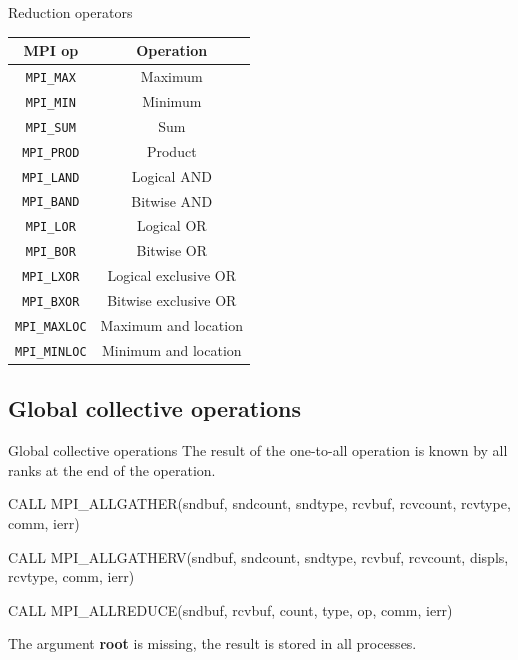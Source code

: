 \documentclass[aspectratio=43]{beamer}
\begin{document}
\begin{frame}[fragile]{Reduction operators}
\begin{center}
\begin{tabular}{|c||c|}
    \hline
    \color{cscsblue}\textbf{MPI op} & \color{cscsbrown}\textbf{Operation} \\\hline\hline
    \verb+MPI_MAX+ & Maximum\\\hline
    \verb+MPI_MIN+ & Minimum\\\hline
    \verb+MPI_SUM+ & Sum\\\hline
    \verb+MPI_PROD+ & Product\\\hline
    \verb+MPI_LAND+ & Logical AND\\\hline
    \verb+MPI_BAND+ & Bitwise AND\\\hline
    \verb+MPI_LOR+ & Logical OR\\\hline
    \verb+MPI_BOR+ & Bitwise OR\\\hline
    \verb+MPI_LXOR+ & Logical exclusive OR\\\hline
    \verb+MPI_BXOR+ & Bitwise exclusive OR\\\hline
    \verb+MPI_MAXLOC+ & Maximum and location\\\hline
    \verb+MPI_MINLOC+ & Minimum and location\\\hline
\end{tabular}
\end{center}
\end{frame}

\subsection{Global collective operations}
\begin{frame}[fragile]{Global collective operations}
The result of the one-to-all operation is known by all ranks at the end of the operation.
\begin{Fortranlisting}[]{}
CALL MPI_ALLGATHER(sndbuf, sndcount, sndtype,
                   rcvbuf, rcvcount, rcvtype,
                   comm, ierr)

CALL MPI_ALLGATHERV(sndbuf, sndcount, sndtype,
                    rcvbuf, rcvcount, displs, rcvtype,
                    comm, ierr)

CALL MPI_ALLREDUCE(sndbuf, rcvbuf, count, type, op,
                   comm, ierr)
\end{Fortranlisting}
The argument \textbf{root} is missing, the result is stored in all processes.\\
\end{frame}
\end{document}
